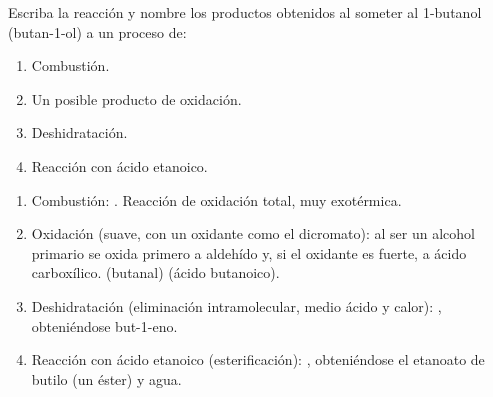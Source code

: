\begin{exerciseEVAU}
    Escriba la reacción y nombre los productos obtenidos al someter al 1-butanol (butan-1-ol) a un proceso de:

    \begin{enumerate}[label=\letraminuscula]
        \item Combustión.
        \item Un posible producto de oxidación.
        \item Deshidratación.
        \item Reacción con ácido etanoico.
    \end{enumerate}

    \begin{solu}


        \begin{enumerate}[label=\letraminuscula]
            \item Combustión: . Reacción de oxidación total, muy exotérmica.

            \item Oxidación (suave, con un oxidante como el dicromato): al ser un alcohol primario se oxida primero a aldehído y, si el oxidante es fuerte, a ácido carboxílico.  (butanal)  (ácido butanoico).

            \item Deshidratación (eliminación intramolecular, medio ácido y calor): , obteniéndose but-1-eno.

            \item Reacción con ácido etanoico (esterificación): , obteniéndose el etanoato de butilo (un éster) y agua.
        \end{enumerate}
    \end{solu}
\end{exerciseEVAU}

